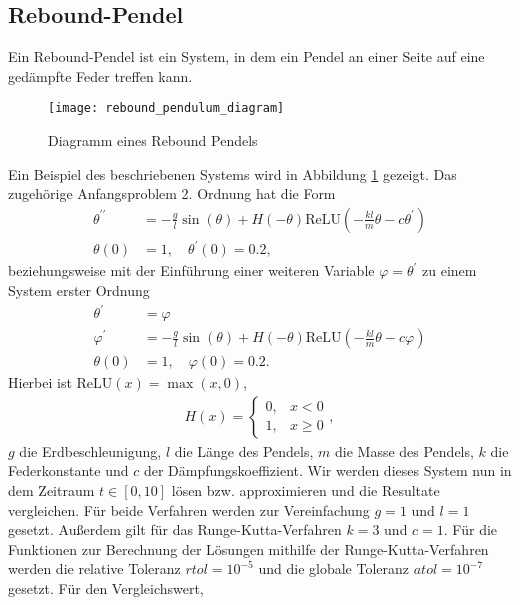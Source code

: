 \subsection{Rebound-Pendel}
\label{subsec:rebound-Pendel}
Ein Rebound-Pendel ist ein System, in dem ein Pendel an einer Seite auf eine gedämpfte Feder treffen kann.
\begin{figure}
       \centering
       \texttt{[image: rebound\_pendulum\_diagram]}
       \caption{Diagramm eines Rebound Pendels\cite[6]{flamantSolvingDifferentialEquations2020}}
       \label{fig:rebound_pendulum_diagram}
\end{figure}
Ein Beispiel des beschriebenen Systems wird in Abbildung \ref{fig:rebound_pendulum_diagram} gezeigt. Das zugehörige
Anfangsproblem 2. Ordnung hat die Form
\begin{align*}
       \theta^{\prime \prime} &= - \frac{g}{l} \sin(\theta) + H(-\theta)
       \text{ReLU}(-\frac{kl}{m}\theta - c \theta^{\prime})\\
       \theta(0) &= 1, \quad \theta^{\prime}(0)=0.2,
\end{align*}
beziehungsweise mit der Einführung einer weiteren Variable $\varphi=\theta^{\prime}$ zu einem System erster Ordnung
\begin{align}
       \theta^{\prime} &= \varphi \nonumber \\
       \varphi^{\prime} &= - \frac{g}{l} \sin(\theta) + H(-\theta)
       \text{ReLU}(-\frac{kl}{m}\theta - c \varphi) \label{rebound-pendulum}\\
       \theta(0) &= 1, \quad \varphi(0)=0.2. \nonumber
\end{align}
Hierbei ist $\text{ReLU}(x)= \max(x, 0)$,
\begin{align*}
       H(x) =
       \begin{cases}
              0, &x<0 \\
              1, &x \geq 0
       \end{cases},
\end{align*}
$g$ die Erdbeschleunigung, $l$ die Länge des Pendels, $m$ die Masse des Pendels, $k$ die Federkonstante und $c$ der
Dämpfungskoeffizient. Wir werden dieses System nun in dem Zeitraum $t \in [0, 10]$ lösen bzw. approximieren und die
Resultate vergleichen. Für beide Verfahren werden zur Vereinfachung $g=1$ und $l=1$ gesetzt. Außerdem gilt für das
Runge-Kutta-Verfahren $k=3$ und $c=1$. Für die Funktionen zur Berechnung der Lösungen mithilfe der Runge-Kutta-Verfahren
werden die relative Toleranz $rtol=10^{-5}$ und die globale Toleranz $atol=10^{-7}$ gesetzt. Für den Vergleichswert,
